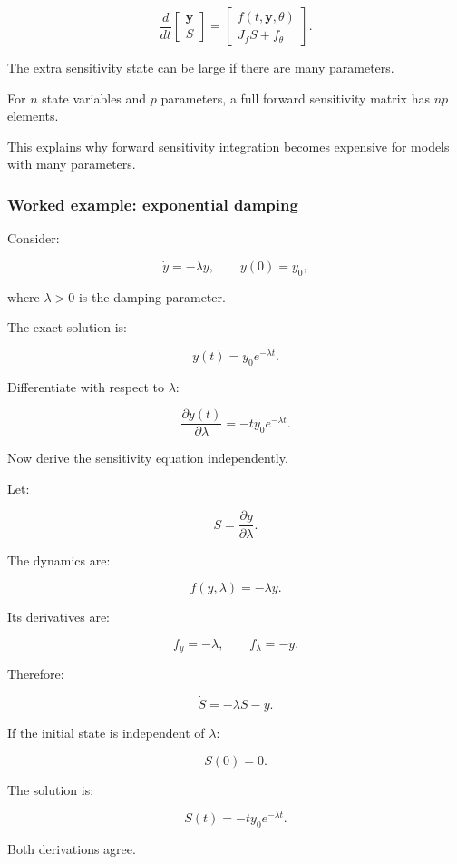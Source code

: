 \[
\frac d{dt} \begin{bmatrix} \mathbf y\\S \end{bmatrix} = \begin{bmatrix} f(t,\mathbf y,\theta)\\ J_fS+f_\theta \end{bmatrix}.
\]

The extra sensitivity state can be large if there are many parameters.

For \(n\) state variables and \(p\) parameters, a full forward sensitivity matrix has \(np\) elements.

This explains why forward sensitivity integration becomes expensive for models with many parameters.

\subsubsection{Worked example: exponential damping}\label{02-foundations-ii-ch022-worked-example-exponential-damping}

Consider:

\[
\dot y=-\lambda y, \qquad y(0)=y_0,
\]

where \(\lambda>0\) is the damping parameter.

The exact solution is:

\[
y(t)=y_0e^{-\lambda t}.
\]

Differentiate with respect to \(\lambda\):

\[
\boxed{ \frac{\partial y(t)}{\partial\lambda} = -ty_0e^{-\lambda t} }.
\]

Now derive the sensitivity equation independently.

Let:

\[
S=\frac{\partial y}{\partial\lambda}.
\]

The dynamics are:

\[
f(y,\lambda)=-\lambda y.
\]

Its derivatives are:

\[
f_y=-\lambda, \qquad f_\lambda=-y.
\]

Therefore:

\[
\boxed{ \dot S=-\lambda S-y }.
\]

If the initial state is independent of \(\lambda\):

\[
S(0)=0.
\]

The solution is:

\[
S(t)=-ty_0e^{-\lambda t}.
\]

Both derivations agree.

